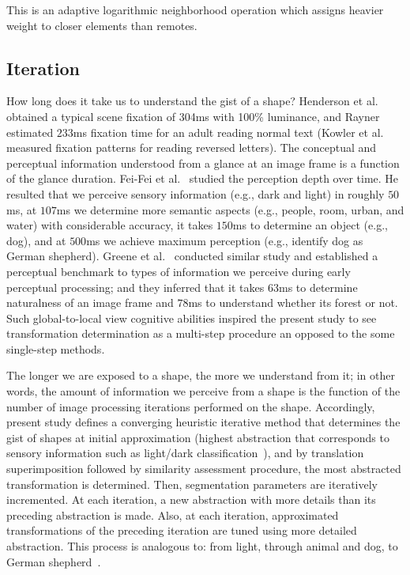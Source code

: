 \noindent
This is an adaptive logarithmic neighborhood operation which assigns heavier weight to closer elements than remotes. 






\subsection{Iteration} \label{section: Iteration}
How long does it take us to understand the gist of a shape? Henderson et al.~\cite{henderson1998eye} obtained a typical scene fixation of 304ms with 100\% luminance, and Rayner~\cite{rayner1998eye} estimated $233$ms fixation time for an adult reading normal text (Kowler et al.~\cite{kowler1987reading} measured fixation patterns for reading reversed letters). The conceptual and perceptual information understood from a glance at an image frame is a function of the glance duration. Fei-Fei et al.~\cite{fei2007we} studied the perception depth over time. He resulted that we perceive sensory information (e.g., dark and light) in roughly $50$ms, at $107$ms we determine more semantic aspects (e.g., people, room, urban, and water) with considerable accuracy, it takes $150$ms to determine an object (e.g., dog), and at $500$ms we achieve maximum perception (e.g., identify dog as German shepherd).  Greene et al.~\cite{greene2009briefest} conducted similar study and established a perceptual benchmark to types of information we perceive during early perceptual processing; and they inferred that it takes $63$ms to determine naturalness of an image frame and $78$ms to understand whether its forest or not. Such global-to-local view cognitive abilities inspired the present study to see transformation determination as a multi-step procedure an opposed to the some single-step methods.

The longer we are exposed to a shape, the more we understand from it; in other words, the amount of information we perceive from a shape is the function of the number of image processing iterations performed on the shape. Accordingly, present study defines a converging heuristic iterative method that determines the gist of shapes at initial approximation (highest abstraction that corresponds to sensory information such as light/dark classification~\cite{fei2007we}), and by translation superimposition followed by similarity assessment procedure, the most abstracted transformation is determined. Then, segmentation parameters are iteratively incremented. At each iteration, a new abstraction with more details than its preceding abstraction is made. Also, at each iteration, approximated transformations of the preceding iteration are tuned using more detailed abstraction. This process is analogous to: from light, through animal and dog, to German shepherd~\cite{fei2007we,greene2009briefest}.

